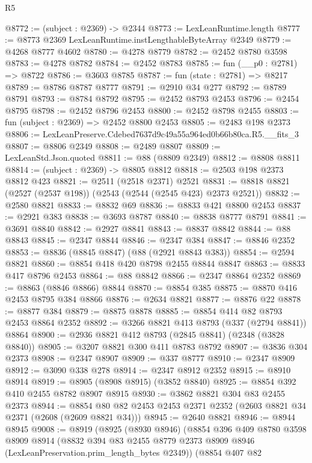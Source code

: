 \begin{lexlean}{R5}
\begin{coremodule}
@8772 := (subject : @2369) -> @2344
@8773 := LexLeanRuntime.length
@8777 := @8773 @2369 LexLeanRuntime.instLengthableByteArray @2349
@8779 := @4268 @8777 @4602
@8780 := @4278 @8779
@8782 := @2452 @8780 @3598
@8783 := @4278 @8782
@8784 := @2452 @8783
@8785 := fun (__p0 : @2781) => @8722
@8786 := @3603 @8785
@8787 := fun (state : @2781) => @8217
@8789 := @8786 @8787 @8777
@8791 := @2910 @34 @277
@8792 := @8789 @8791
@8793 := @8784 @8792
@8795 := @2452 @8793 @2453
@8796 := @2454 @8795
@8798 := @2452 @8796 @2453
@8800 := @2452 @8798 @2455
@8803 := fun (subject : @2369) => @2452 @8800 @2453
@8805 := @2483 @198 @2373
@8806 := LexLeanPreserve.Cdebed7637d9c49a55a964ed0b66b80ca.R5.__fits_3
@8807 := @8806 @2349
@8808 := @2489 @8807
@8809 := LexLeanStd.Json.quoted
@8811 := @88 (@8809 @2349)
@8812 := @8808 @8811
@8814 := (subject : @2369) -> @8805 @8812
@8818 := @2503 @198 @2373 @8812 @423
@8821 := @2511 (@2518 @2371) @2521
@8831 := @8818 @8821 (@2527 (@2537 @198)) (@2543 (@2544 (@2545 @423) @2373 @2521))
@8832 := @2580 @8821
@8833 := @8832 @69
@8836 := @8833 @421 @8800 @2453
@8837 := @2921 @383
@8838 := @3693 @8787
@8840 := @8838 @8777 @8791
@8841 := @3691 @8840
@8842 := @2927 @8841
@8843 := @8837 @8842
@8844 := @88 @8843
@8845 := @2347 @8844
@8846 := @2347 @384
@8847 := @8846 @2352
@8853 := @8836 (@8845 @8847) (@88 (@2921 @8843 @383))
@8854 := @2594 @8821
@8860 := @8854 @418 @420 @8798 @2455 @8844 @8847
@8863 := @8833 @417 @8796 @2453
@8864 := @88 @8842
@8866 := @2347 @8864 @2352
@8869 := @8863 (@8846 @8866) @8844
@8870 := @8854 @385
@8875 := @8870 @416 @2453 @8795 @384 @8866
@8876 := @2634 @8821
@8877 := @8876 @22
@8878 := @8877 @384
@8879 := @8875 @8878
@8885 := @8854 @414 @82 @8793 @2453 @8864 @2352
@8892 := @3266 @8821 @413 @8793 (@337 (@2794 @8841)) @8864
@8900 := @2936 @8821 @412 @8793 (@2845 @8841) (@2348 (@3828 @8840))
@8905 := @3207 @8821 @300 @411 @8783 @8792
@8907 := @3836 @304 @2373
@8908 := @2347 @8907
@8909 := @337 @8777
@8910 := @2347 @8909
@8912 := @3090 @338 @278
@8914 := @2347 @8912 @2352
@8915 := @8910 @8914
@8919 := @8905 (@8908 @8915) (@3852 @8840)
@8925 := @8854 @392 @410 @2455 @8782 @8907 @8915
@8930 := @3862 @8821 @304 @83 @2455 @2373
@8944 := @8854 @80 @82 @2453 @2453 @2371 @2352 (@2603 @8821 @34 @2371 (@2608 (@2609 @8821 @34)))
@8945 := @2640 @8821
@8946 := @8944 @8945
@9008 := @8919
    (@8925
      (@8930 @8946)
      (@8854
        @396
        @409
        @8780
        @3598
        @8909
        @8914
        (@8832 @394 @83 @2455 @8779 @2373 @8909 @8946 (LexLeanPreservation.prim_length_bytes @2349))
        (@8854
          @407
          @82

\end{coremodule}
\end{lexlean}
